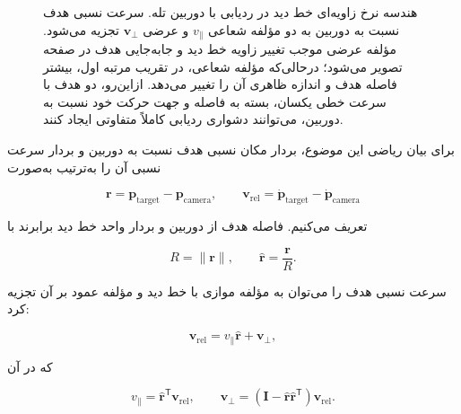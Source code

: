 \documentclass[12pt,a4paper]{article}
\newcommand{\TikzFaText}[2][4cm]{%
	\parbox{#1}{%
		\setRTL
		\centering
		#2%
	}%
}
\begin{document}
\begin{figure}[t]
{%
	}
	
	\caption{
		هندسه نرخ زاویه‌ای خط دید در ردیابی با دوربین تله.
		سرعت نسبی هدف نسبت به دوربین به دو مؤلفه شعاعی
		\(v_{\parallel}\)
		و عرضی
		\(\mathbf v_{\perp}\)
		تجزیه می‌شود. مؤلفه عرضی موجب تغییر زاویه خط دید و
		جابه‌جایی هدف در صفحه تصویر می‌شود؛ درحالی‌که مؤلفه شعاعی،
		در تقریب مرتبه اول، بیشتر فاصله هدف و اندازه ظاهری آن را
		تغییر می‌دهد. ازاین‌رو، دو هدف با سرعت خطی یکسان، بسته به
		فاصله و جهت حرکت خود نسبت به دوربین، می‌توانند دشواری
		ردیابی کاملاً متفاوتی ایجاد کنند.
	}
	\label{fig:los-geometry}
\end{figure}

برای بیان ریاضی این موضوع، بردار مکان نسبی هدف نسبت به دوربین و
بردار سرعت نسبی آن را به‌ترتیب به‌صورت

\begin{equation}
	\mathbf r
	=
	\mathbf p_{\mathrm{target}}
	-
	\mathbf p_{\mathrm{camera}},
	\qquad
	\mathbf v_{\mathrm{rel}}
	=
	\dot{\mathbf p}_{\mathrm{target}}
	-
	\dot{\mathbf p}_{\mathrm{camera}}
	\label{eq:relative-position-velocity}
\end{equation}

تعریف می‌کنیم. فاصله هدف از دوربین و بردار واحد خط دید برابرند با

\begin{equation}
	R=\|\mathbf r\|,
	\qquad
	\widehat{\mathbf r}
	=
	\frac{\mathbf r}{R}.
	\label{eq:range-unit-los}
\end{equation}

سرعت نسبی هدف را می‌توان به مؤلفه موازی با خط دید و مؤلفه عمود بر
آن تجزیه کرد:

\begin{equation}
	\mathbf v_{\mathrm{rel}}
	=
	v_{\parallel}\widehat{\mathbf r}
	+
	\mathbf v_{\perp},
	\label{eq:relative-velocity-decomposition}
\end{equation}

که در آن

\begin{equation}
	v_{\parallel}
	=
	\widehat{\mathbf r}^{\mathsf T}
	\mathbf v_{\mathrm{rel}},
	\qquad
	\mathbf v_{\perp}
	=
	\left(
	\mathbf I
	-
	\widehat{\mathbf r}
	\widehat{\mathbf r}^{\mathsf T}
	\right)
	\mathbf v_{\mathrm{rel}}.
	\label{eq:radial-transverse-components}
\end{equation}
\end{document}
